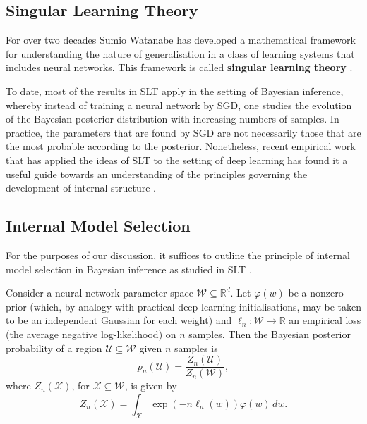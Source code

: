 \subsection{Singular Learning Theory}

For over two decades Sumio Watanabe has developed a mathematical framework for understanding the nature of generalisation in a class of learning systems that includes neural networks. This framework is called \textbf{singular learning theory} \citep[SLT;][see \citealp{wei2022deep,watanabe2024recent} for an overview]{watanabe2009algebraic,watanabe2018}.
%

To date, most of the results in SLT apply in the setting of Bayesian inference, whereby instead of training a neural network by SGD, one studies the evolution of the Bayesian posterior distribution with increasing numbers of samples.
%
In practice, the parameters that are found by SGD are not necessarily those that are the most probable according to the posterior.
%
Nonetheless, recent empirical work that has applied the ideas of SLT to the setting of deep learning has found it a useful guide towards an understanding of the principles governing the development of internal structure \citep{chen2023dynamical,hoogland2024developmental,wang2024differentiation,urdshals2024structure,carroll2025dynamicstransientstructureincontext}.




\subsection{Internal Model Selection}\label{section:internal_model_selection}

For the purposes of our discussion, it suffices to outline the principle of internal model selection in Bayesian inference as studied in SLT
    \citetext{%
        \citealp[\S7.6]{watanabe2009algebraic};
        \citealp{chen2023dynamical};
        see also \citealp{carroll2025dynamicstransientstructureincontext}%
    }.

Consider a neural network parameter space
    $\mathcal{W} \subseteq \mathbb{R}^d$.
Let
    $\varphi(w)$
be a nonzero prior (which, by analogy with practical deep learning initialisations, may be taken to be an independent Gaussian for each weight) and
    $\ell_n : \mathcal{W} \to \mathbb{R}$
an empirical loss (the average negative log-likelihood) on $n$ samples.
%
Then the Bayesian posterior probability of a region 
    $\mathcal{U} \subseteq \mathcal{W}$
given $n$ samples is
\begin{equation*}
    p_n(\mathcal{U})
    =
    \frac{Z_n(\mathcal{U})}{Z_n(\mathcal{W})},
\end{equation*}
where $Z_n(\mathcal{X})$, for $\mathcal{X} \subseteq \mathcal{W}$, is given by
\begin{equation*}
    Z_n(\mathcal{X})
    =
    \int_{\mathcal{X}}\exp(-n\ell_n(w))\varphi(w)\,dw.
\end{equation*}

